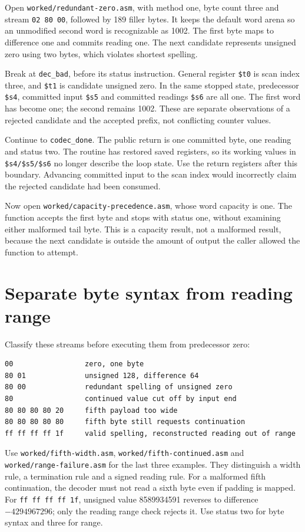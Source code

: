 Open \texttt{worked/redundant-zero.asm}, with method one, byte count three
and stream \texttt{02 80 00}, followed by 189 filler bytes. It keeps the default word arena
so an unmodified second word is recognizable as 1002. The first byte maps to
difference one and commits reading one. The next candidate represents unsigned
zero using two bytes, which violates shortest spelling.

Break at \texttt{dec\_bad}, before its status instruction. General register
\texttt{\$t0} is scan index three, and \texttt{\$t1} is candidate unsigned
zero. In the same stopped state, predecessor \texttt{\$s4}, committed input
\texttt{\$s5} and committed readings \texttt{\$s6} are all one. The first
word has become one; the second remains 1002. These are separate observations
of a rejected candidate and the accepted prefix, not conflicting counter values.



Continue to \texttt{codec\_done}. The public return is one committed byte,
one reading and status two. The routine has restored saved registers, so its
working values in \texttt{\$s4/\$s5/\$s6} no longer describe the loop state.
Use the return registers after this boundary. Advancing committed input to the
scan index would incorrectly claim the rejected candidate had been consumed.

Now open \texttt{worked/capacity-precedence.asm}, whose word capacity is one. The function accepts the first byte and stops
with status one, without examining either malformed tail byte. This is a
capacity result, not a malformed result, because the next candidate is outside
the amount of output the caller allowed the function to attempt.

\section{Separate byte syntax from reading range}

Classify these streams before executing them from predecessor zero:
\begin{verbatim}
00                 zero, one byte
80 01              unsigned 128, difference 64
80 00              redundant spelling of unsigned zero
80                 continued value cut off by input end
80 80 80 80 20     fifth payload too wide
80 80 80 80 80     fifth byte still requests continuation
ff ff ff ff 1f     valid spelling, reconstructed reading out of range
\end{verbatim}
Use \texttt{worked/fifth-width.asm}, \texttt{worked/fifth-continued.asm} and
\texttt{worked/range-failure.asm} for the last three examples. They distinguish
a width rule, a termination rule and a signed reading rule. For a malformed fifth continuation, the decoder must not
read a sixth byte even if padding is mapped. For \texttt{ff ff ff ff 1f},
unsigned value 8589934591 reverses to difference $-4294967296$; only the reading
range check rejects it. Use status two for byte syntax and three for range.

